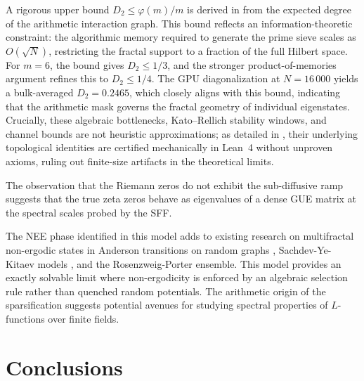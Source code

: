 \documentclass[11pt,a4paper]{article}
\begin{document}
A rigorous upper bound $D_2 \le \varphi(m)/m$ is derived in  from the expected degree of the arithmetic interaction graph. This bound reflects an information-theoretic constraint: the algorithmic memory required to generate the prime sieve scales as $O(\sqrt{N})$, restricting the fractal support to a fraction of the full Hilbert space. For $m=6$, the bound gives $D_2 \le 1/3$, and the stronger product-of-memories argument refines this to $D_2 \le 1/4$. The GPU diagonalization at $N=16\,000$ yields a bulk-averaged $D_2 = 0.2465$, which closely aligns with this bound, indicating that the arithmetic mask governs the fractal geometry of individual eigenstates.
Crucially, these algebraic bottlenecks, Kato--Rellich stability windows, and channel bounds are not heuristic approximations; as detailed in , their underlying topological identities are certified mechanically in Lean~4 without unproven axioms, ruling out finite-size artifacts in the theoretical limits.

The observation that the Riemann zeros do not exhibit the sub-diffusive ramp suggests that the true zeta zeros behave as eigenvalues of a dense GUE matrix at the spectral scales probed by the SFF. 

The NEE phase identified in this model adds to existing research on multifractal non-ergodic states in Anderson transitions on random graphs \cite{Kravtsov2015}, Sachdev-Ye-Kitaev models \cite{Legramandi2024}, and the Rosenzweig-Porter ensemble. This model provides an exactly solvable limit where non-ergodicity is enforced by an algebraic selection rule rather than quenched random potentials. The arithmetic origin of the sparsification suggests potential avenues for studying spectral properties of $L$-functions over finite fields.

\section{Conclusions}
\label{sec:conclusions}
\end{document}
